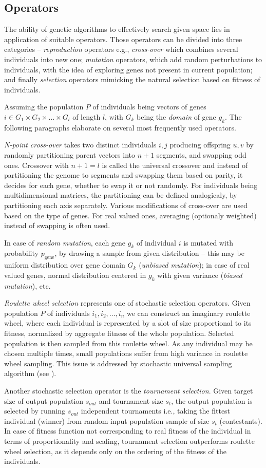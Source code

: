 \subsection{Operators}
The ability of genetic algorithms to effectively search given space lies in application of suitable operators. Those operators can be divided into three categories -- \emph{reproduction} operators e.g., \emph{cross-over} which combines several individuals into new one; \emph{mutation} operators, which add random perturbations to individuals, with the idea of exploring genes not present in current population; and finally \emph{selection} operators mimicking the natural selection based on fitness of individuals.

Assuming the population $P$ of individuals being vectors of genes $i \in G_1 \times G_2 \times \dots \times G_l$ of length $l$, with $G_k$ being the \emph{domain} of gene $g_k$. The following paragraphs elaborate on several most frequently used operators.

\emph{N-point cross-over} takes two distinct individuals $i, j$ producing offspring $u, v$ by randomly partitioning parent vectors into $n+1$ segments, and swapping odd ones. Crossover with $n + 1 = l$ is called the universal crossover and instead of partitioning the genome to segments and swapping them based on parity, it decides for each gene, whether to swap it or not randomly. For individuals being multidimensional matrices, the partitioning can be defined analogicaly, by partitioning each axis separately. Various modifications of cross-over are used based on the type of genes. For real valued ones, averaging (optionaly weighted) instead of swapping is often used.

In case of \emph{random mutation}, each gene $g_k$ of individual $i$ is mutated with probability $p_{\text{gene}}$, by drawing a sample from given distribution -- this may be uniform distribution over gene domain $G_k$ (\emph{unbiased mutation}); in case of real valued genes, normal distribution centered in $g_k$ with given variance (\emph{biased mutation}), etc.

\emph{Roulette wheel selection} represents one of stochastic selection operators. Given population $P$ of individuals $i_1, i_2, \dots, i_n$ we can construct an imaginary roulette wheel, where each individual is represented by a slot of size proportional to its fitness, normalized by aggregate fitness of the whole population. Selected population is then sampled from this roulette wheel. As any individual may be chosen multiple times, small populations suffer from high variance in roulette wheel sampling. This issue is addressed by stochastic universal sampling algorithm (see \cite{evolution}).

Another stochastic selection operator is the \emph{tournament selection}. Given target size of output population $s_{out}$ and tournament size $s_t$, the output population is selected by running $s_{out}$ independent tournaments i.e., taking the fittest individual (winner) from random input population sample of size $s_t$ (contestants). In case of fitness function not corresponding to real fitness of the individual in terms of proportionality and scaling, tournament selection outperforms roulette wheel selection, as it depends only on the ordering of the fitness of the individuals.
